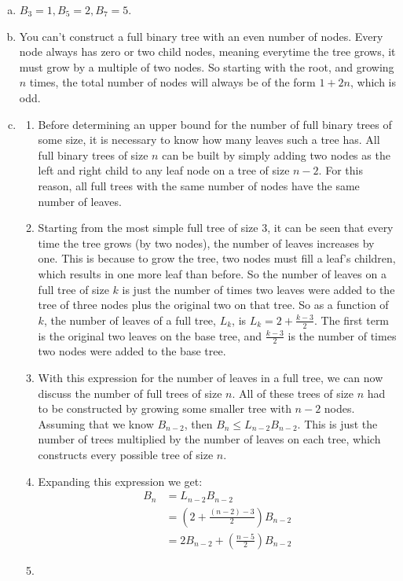 \documentclass[a4paper,12pt]{article}
\begin{document}
\begin{enumerate}[a)]

\item $B_3 = 1, B_5 = 2, B_7 = 5$.

\item You can't construct a full binary tree with an even number of
  nodes. Every node always has zero or two child nodes, meaning
  everytime the tree grows, it must grow by a multiple of two
  nodes. So starting with the root, and growing $n$ times, the total
  number of nodes will always be of the form $1 + 2n$, which is odd.

\item

  \begin{enumerate}[]
    
  \item Before determining an upper bound for the number of full
    binary trees of some size, it is necessary to know how many leaves
    such a tree has. All full binary trees of size $n$ can be built by
    simply adding two nodes as the left and right child to any leaf
    node on a tree of size $n-2$. For this reason, all full trees with
    the same number of nodes have the same number of leaves.

  \item Starting from the most simple full tree of size 3, it can be
    seen that every time the tree grows (by two nodes), the number of
    leaves increases by one. This is because to grow the tree, two
    nodes must fill a leaf's children, which results in one more leaf
    than before. So the number of leaves on a full tree of size $k$ is
    just the number of times two leaves were added to the tree of
    three nodes plus the original two on that tree. So as a function
    of $k$, the number of leaves of a full tree, $L_k$, is $L_k = 2 +
    \frac{k-3}{2}$. The first term is the original two leaves on the
    base tree, and $\frac{k-3}{2}$ is the number of times two nodes
    were added to the base tree.

  \item With this expression for the number of leaves in a full tree,
    we can now discuss the number of full trees of size $n$. All of
    these trees of size $n$ had to be constructed by growing some
    smaller tree with $n-2$ nodes. Assuming that we know $B_{n-2}$,
    then $B_n \le L_{n-2}B_{n-2}$. This is just the number of trees
    multiplied by the number of leaves on each tree, which constructs
    every possible tree of size $n$.

  \item Expanding this expression we get:
    \begin{align*}
      B_n &= L_{n-2}B_{n-2}\\
      &= (2 + \frac{(n-2) - 3}{2})B_{n-2}\\
      &= 2B_{n-2} + (\frac{n-5}{2})B_{n-2}
    \end{align*}
    

  \item 
    

  \end{enumerate}

\end{enumerate}
\end{document}
